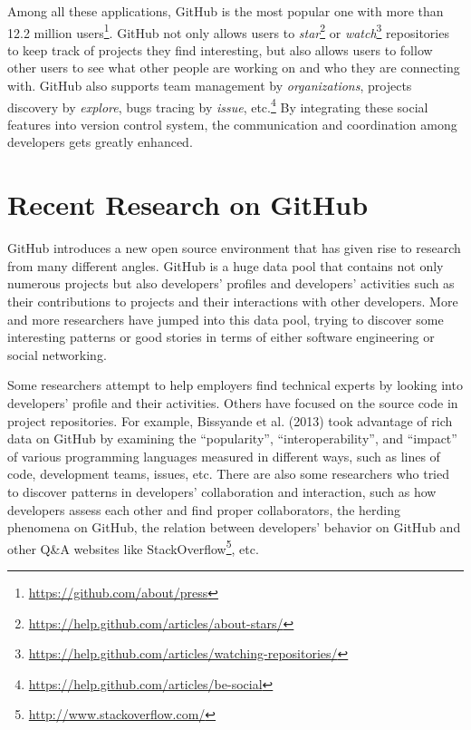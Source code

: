 Among all these applications, GitHub is the most popular one with more than 12.2 million users\footnote{\url{https://github.com/about/press}}. GitHub not only allows users to \textit{star}\footnote{\url{https://help.github.com/articles/about-stars/}} or \textit{watch}\footnote{\url{https://help.github.com/articles/watching-repositories/}} repositories to keep track of projects they find interesting, but also allows users to follow other users to see what other people are working on and who they are connecting with. GitHub also supports team management by \textit{organizations}, projects discovery by \textit{explore}, bugs tracing by \textit{issue}, etc.\footnote{\url{https://help.github.com/articles/be-social}} By integrating these social features into version control system, the communication and coordination among developers gets greatly enhanced.\cite{6357175}

\section{Recent Research on GitHub}
GitHub introduces a new open source environment that has given rise to research from many different angles. GitHub is a huge data pool that contains not only numerous projects but also developers' profiles and developers' activities such as their contributions to projects and their interactions with other developers. More and more researchers have jumped into this data pool, trying to discover some interesting patterns or good stories in terms of either software engineering or social networking. 

Some researchers attempt to help employers find technical experts by looking into developers' profile and their activities.\cite{6336698}\cite{Marlow:2013:ATS:2441776.2441794}\cite{Venkataramani:2013:DTE:2487788.2487832}\cite{6671295} Others have focused on the source code in project repositories. For example, Bissyande et al. (2013) took advantage of rich data on GitHub by examining the ``popularity'', ``interoperability'', and ``impact'' of various programming languages measured in different ways, such as lines of code, development teams, issues, etc.\cite{6649842} There are also some researchers who tried to discover patterns in developers' collaboration and interaction, such as how developers assess each other and find proper collaborators\cite{Majumder:2012:CTF:2339530.2339690}\cite{Marlow:2013:IFO:2441776.2441792}\cite{Singer:2013:MAS:2441776.2441791}, the herding phenomena on GitHub\cite{Choi:2013:HOS:2441955.2441989}, the relation between developers' behavior on GitHub and other Q\&A websites like StackOverflow\footnote{\url{http://www.stackoverflow.com/}}\cite{6693332}, etc.

